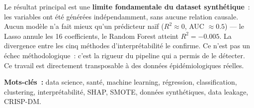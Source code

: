 Le résultat principal est une \textbf{limite fondamentale du dataset synthétique}~: les variables ont été générées indépendamment, sans aucune relation causale. Aucun modèle n'a fait mieux qu'un prédicteur naïf ($R^2 \approx 0$, AUC $\approx 0.5$) — le Lasso annule les 16 coefficients, le Random Forest atteint $R^2 = -0.005$. La divergence entre les cinq méthodes d'interprétabilité le confirme. Ce n'est pas un échec méthodologique~: c'est la rigueur du pipeline qui a permis de le détecter. Ce travail est directement transposable à des données épidémiologiques réelles.

\bigskip
\noindent\textbf{Mots-clés~:} data science, santé, machine learning, régression, classification, clustering, interprétabilité, SHAP, SMOTE, données synthétiques, data leakage, CRISP-DM.

\newpage
